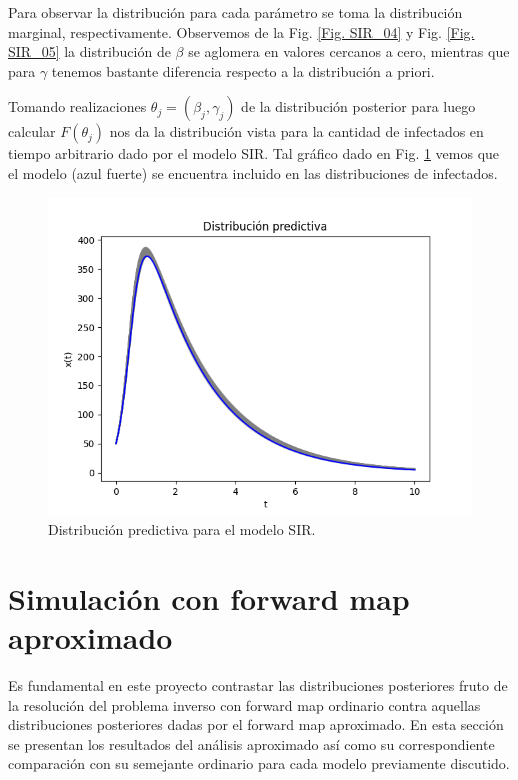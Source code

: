 Para observar la distribución para cada parámetro se toma la distribución marginal, respectivamente. Observemos de la Fig. \ref{Fig. SIR_04} y Fig. \ref{Fig. SIR_05} la distribución de $\beta$ se aglomera en valores cercanos a cero, mientras que para $\gamma$ tenemos bastante diferencia respecto a la distribución a priori.

Tomando realizaciones $ \theta_j = (\beta_j,\gamma_j)$ de la distribución posterior para luego calcular $F(\theta_j)$ nos da la distribución vista para la cantidad de infectados en tiempo arbitrario dado por el modelo SIR. Tal gráfico dado en Fig. \ref{Fig. SIR_06} vemos que el modelo (azul fuerte) se encuentra incluido en las distribuciones de infectados.

\begin{figure}[H] 
    \centering 
    \includegraphics[width = 10 cm ]{img/Exp_Central_SIR_sigma/Figuras/Generales/Predictiva_SIR_sigma.png} 
    \caption{Distribución predictiva para el modelo SIR.}
    \label{Fig. SIR_06}
\end{figure} 


\section{Simulación con forward map aproximado}

Es fundamental en este proyecto contrastar las distribuciones posteriores fruto de la resolución del problema inverso con forward map ordinario contra aquellas distribuciones posteriores dadas por el forward map aproximado. En esta sección se presentan los resultados del análisis aproximado así como su correspondiente comparación con su semejante ordinario para cada modelo previamente discutido.

